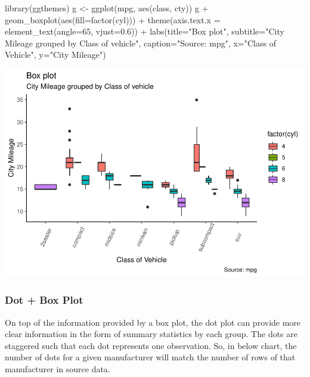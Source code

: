 \documentclass[a4paper]{article}
\newenvironment{Shaded}{}{}
\newcommand{\KeywordTok}[1]{\textcolor[rgb]{0.00,0.00,1.00}{#1}}
\newcommand{\DataTypeTok}[1]{#1}
\newcommand{\DecValTok}[1]{#1}
\newcommand{\FloatTok}[1]{#1}
\newcommand{\StringTok}[1]{\textcolor[rgb]{0.00,0.50,0.50}{#1}}
\newcommand{\OperatorTok}[1]{#1}
\newcommand{\NormalTok}[1]{#1}
\begin{document}
\newpage   

\begin{Shaded}
\begin{Highlighting}[]
\KeywordTok{library}\NormalTok{(ggthemes)}
\NormalTok{g <-}\StringTok{ }\KeywordTok{ggplot}\NormalTok{(mpg, }\KeywordTok{aes}\NormalTok{(class, cty))}
\NormalTok{g }\OperatorTok{+}\StringTok{ }\KeywordTok{geom_boxplot}\NormalTok{(}\KeywordTok{aes}\NormalTok{(}\DataTypeTok{fill=}\KeywordTok{factor}\NormalTok{(cyl))) }\OperatorTok{+}\StringTok{ }
\StringTok{  }\KeywordTok{theme}\NormalTok{(}\DataTypeTok{axis.text.x =} \KeywordTok{element_text}\NormalTok{(}\DataTypeTok{angle=}\DecValTok{65}\NormalTok{, }\DataTypeTok{vjust=}\FloatTok{0.6}\NormalTok{)) }\OperatorTok{+}\StringTok{ }
\StringTok{  }\KeywordTok{labs}\NormalTok{(}\DataTypeTok{title=}\StringTok{"Box plot"}\NormalTok{, }
       \DataTypeTok{subtitle=}\StringTok{"City Mileage grouped by Class of vehicle"}\NormalTok{,}
       \DataTypeTok{caption=}\StringTok{"Source: mpg"}\NormalTok{,}
       \DataTypeTok{x=}\StringTok{"Class of Vehicle"}\NormalTok{,}
       \DataTypeTok{y=}\StringTok{"City Mileage"}\NormalTok{)}
\end{Highlighting}
\end{Shaded}

\includegraphics{M24-ggplot2_Gallery_files/figure-latex/unnamed-chunk-27-1.pdf}
\newpage

\subsubsection{Dot + Box Plot}\label{dot-box-plot}

On top of the information provided by a box plot, the dot plot can
provide more clear information in the form of summary statistics by each
group. The dots are staggered such that each dot represents one
observation. So, in below chart, the number of dots for a given
manufacturer will match the number of rows of that manufacturer in
source data.
\end{document}
